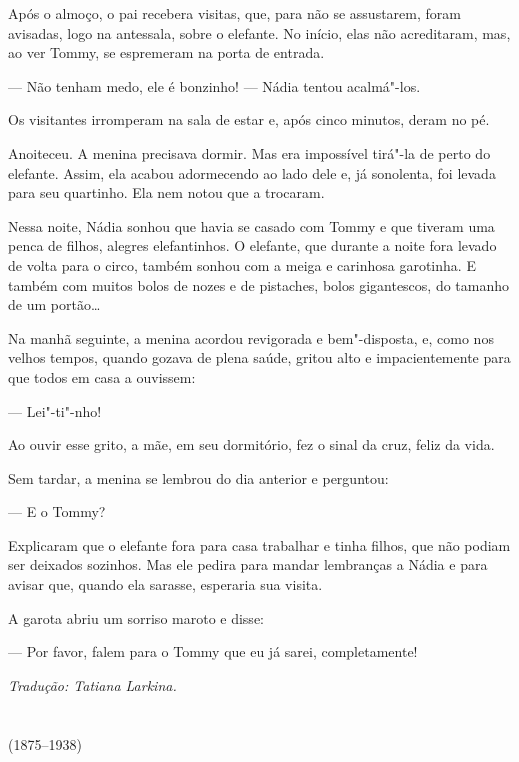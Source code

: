 Após o almoço, o pai recebera visitas, que, para não se assustarem,
foram avisadas, logo na antessala, sobre o elefante. No início, elas não
acreditaram, mas, ao ver Tommy, se espremeram na porta de entrada.

--- Não tenham medo, ele é bonzinho! --- Nádia ten­tou acalmá"-los.

Os visitantes irromperam na sala de estar e, após cinco minutos, deram
no pé.

Anoiteceu. A menina precisava dormir. Mas era impossível tirá"-la de
perto do elefante. Assim, ela acabou adormecendo ao lado dele e, já
sonolenta, foi levada para seu quartinho. Ela nem notou que a trocaram.

Nessa noite, Nádia sonhou que havia se casado com Tommy e que tiveram
uma penca de filhos, alegres elefantinhos. O elefante, que durante a
noite fora levado de volta para o circo, também sonhou com a meiga e
carinhosa garotinha. E também com muitos bolos de nozes e de pis­taches,
bolos gigantescos, do tamanho de um portão\ldots{}

Na manhã seguinte, a menina acordou revigorada e bem"-disposta, e, como
nos velhos tempos, quando gozava de plena saúde, gritou alto e
impacientemente para que todos em casa a ouvissem:

--- Lei"-ti"-nho!

Ao ouvir esse grito, a mãe, em seu dormitório, fez o sinal da cruz,
feliz da vida.

Sem tardar, a menina se lembrou do dia anterior e perguntou:

--- E o Tommy?

Explicaram que o elefante fora para casa trabalhar e tinha filhos, que
não podiam ser deixados sozinhos. Mas ele pedira para mandar lembranças
a Nádia e para avisar que, quando ela sarasse, esperaria sua visita.

A garota abriu um sorriso maroto e disse:

--- Por favor, falem para o Tommy que eu já sarei, completamente!

\medskip

{\footnotesize\hfill\emph{Tradução: Tatiana Larkina.}}

\chapter*{}
\label{part12}
\thispagestyle{empty}

\begin{vplace}[1.5]
{\HUGES\hfill{}}

{\LARGE\hfill\textlt(1875–1938)}
\end{vplace}

